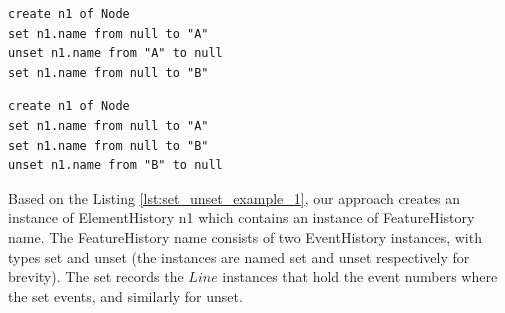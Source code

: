 \vspace{-20pt}
\begin{minipage}[t]{0.49\linewidth}
\begin{lstlisting}[style=eol,caption={A CBP representation of attribute \textsf{name} assignments ended with SET.},label=lst:set_unset_example_1]
create n1 of Node
set n1.name from null to "A"
unset n1.name from "A" to null
set n1.name from null to "B"
\end{lstlisting}
\end{minipage}
\hfill
\begin{minipage}[t]{0.49\linewidth}
\begin{lstlisting}[style=eol,caption={A CBP representation of attribute \textsf{name} assignments ended with UNSET.},label=lst:set_unset_example_2]
create n1 of Node
set n1.name from null to "A"
set n1.name from null to "B"
unset n1.name from "B" to null
\end{lstlisting}
\end{minipage}

Based on the Listing \ref{lst:set_unset_example_1}, our approach creates an instance of \textsf{ElementHistory} \textsf{n1} which contains an instance of \textsf{FeatureHistory} \textsf{name}. The \textsf{FeatureHistory} \textsf{name} consists of two \textsf{EventHistory} instances, with types \textsf{set} and \textsf{unset} (the instances are named \textsf{set} and \textsf{unset} respectively for brevity). The \textsf{set} records the $Line$ instances that hold the event numbers where the \textsf{set} events, and similarly for \textsf{unset}.

